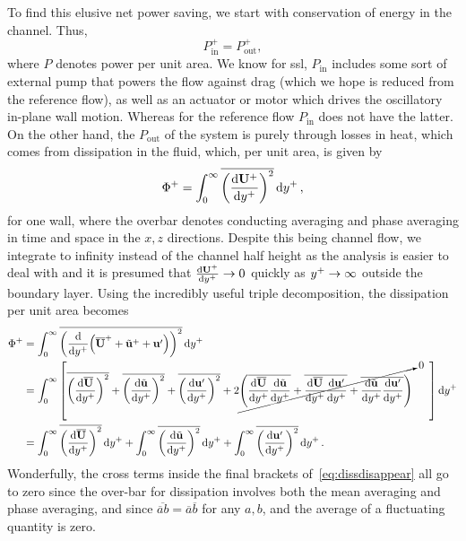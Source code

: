 To find this elusive net power saving, we start with conservation of energy in the channel. Thus,
\begin{equation}
	P_\text{in}^{+}=P_\text{out}^{+}
,\end{equation}
where $P$ denotes power per unit area. We know for \gls*{ssl}, $P_\text{in} $ includes some sort of external pump that powers the flow against drag (which we hope is reduced from the reference flow), as well as an actuator or motor which drives the oscillatory in-plane wall motion. Whereas for the reference flow $P_\text{in} $ does not have the latter. On the other hand, the $P_\text{out} $ of the system is purely through losses in heat, which comes from dissipation in the fluid, which, per unit area, is given by
\begin{equation}
	\Phi ^{+}=\int_{0}^{\infty} \overline{\left( \dv{\mathbf{U} \ensuremath{^{+}}}{y\ensuremath{^{+}}}  \right) ^2}  \dd{y\ensuremath{^{+}}} 
,\end{equation}
for one wall, where the overbar denotes conducting averaging and phase averaging in time and space in the $x,z$ directions. Despite this being channel flow, we integrate to infinity instead of the channel half height as the analysis is easier to deal with and it is presumed that $\dv{\mathbf{U}\ensuremath{^{+}}}{y\ensuremath{^{+}}} \to0$ quickly as $y^{+}\to\infty$ outside the boundary layer. Using the incredibly useful triple decomposition, the dissipation per unit area becomes
\begin{align}
	\Phi ^{+}&=\int_{0}^{\infty} \overline{\left( \dv{y\ensuremath{^{+}}}(\overline{\mathbf{U}} ^{+} + \tilde{\mathbf{u} }^{+} + \mathbf{u'} )  \right) ^2}  \dd{y\ensuremath{^{+}}}\\ 
		 &=\int_{0}^{\infty} \left[ \overline{\left( \dv{\overline{\mathbf{U} }}{y\ensuremath{^{+}}}  \right) ^2}+\overline{\left( \dv{\tilde{\mathbf{u} }}{y\ensuremath{^{+}}}  \right) ^2} + \overline{\left(\dv{\mathbf{u'} }{y\ensuremath{^{+}}}\right) ^2} + 2\cancelto{0}{\left( \overline{\dv{ \overline{\mathbf{U} }}{y\ensuremath{^{+}}}\dv{ \tilde{\mathbf{u} }}{y\ensuremath{^{+}}} } + \overline{\dv{ \overline{\mathbf{U} }}{y\ensuremath{^{+}}}\dv{\mathbf{u'} }{y\ensuremath{^{+}}} } + \overline{\dv{ \tilde{\mathbf{u} }}{y\ensuremath{^{+}}}\dv{\mathbf{u'}}{y\ensuremath{^{+}}} } \right)}\phantom{--} \right] \dd{y\ensuremath{^{+}}} \label{eq:dissdisappear}  \\
		 &=\int_{0}^{\infty}  \overline{\left( \dv{\overline{\mathbf{U} }}{y\ensuremath{^{+}}}  \right) ^2}\dd{y\ensuremath{^{+}}}+\int_{0}^{\infty}  \overline{\left( \dv{\tilde{\mathbf{u} }}{y\ensuremath{^{+}}}  \right) ^2} \dd{y\ensuremath{^{+}}} + \int_{0}^{\infty}  \overline{\left(\dv{\mathbf{u'} }{y\ensuremath{^{+}}}\right) ^2} \dd{y\ensuremath{^{+}}}
.\end{align}
Wonderfully, the cross terms inside the final brackets of~\ref{eq:dissdisappear} all go to zero since the over-bar for dissipation involves both the mean averaging and phase averaging, and since $\overline{\overline{a}b}=\overline{a}\overline{b}$ for any $a,b$, and the average of a fluctuating quantity is zero.

